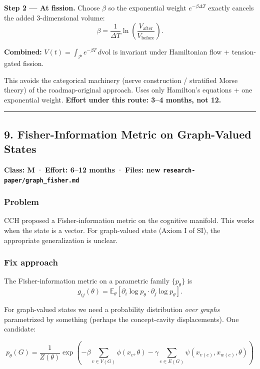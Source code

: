\documentclass[
  11pt,
  a4paper,
]{article}
\begin{document}
\textbf{Step 2 --- At fission.} Choose \(\beta\) so the exponential
weight \(e^{-\beta \Delta T}\) exactly cancels the added 3-dimensional
volume: \[
\beta = \frac{1}{\Delta T} \ln\!\left(\frac{V_\text{after}}{V_\text{before}}\right).
\]

\textbf{Combined:}
\(V(t) = \int_{\mathcal{P}} e^{-\beta T} \, d\text{vol}\) is invariant
under Hamiltonian flow + tension-gated fission.

This avoids the categorical machinery (nerve construction / stratified
Morse theory) of the roadmap-original approach. Uses only Hamilton's
equations + one exponential weight. \textbf{Effort under this route:
3--4 months, not 12.}

\begin{center}\rule{0.5\linewidth}{0.5pt}\end{center}

\subsection{9. Fisher-Information Metric on Graph-Valued
States}\label{fisher-information-metric-on-graph-valued-states}

\textbf{Class: M} · \textbf{Effort: 6--12 months} · \textbf{Files: new
\texttt{research-paper/graph\_fisher.md}}

\subsubsection{Problem}\label{problem-8}

CCH proposed a Fisher-information metric on the cognitive manifold. This
works when the state is a vector. For graph-valued state (Axiom I of
SI), the appropriate generalization is unclear.

\subsubsection{Fix approach}\label{fix-approach-1}

The Fisher-information metric on a parametric family \(\{p_\theta\}\) is
\[
g_{ij}(\theta) = \mathbb{E}_\theta\left[\partial_i \log p_\theta \cdot \partial_j \log p_\theta\right].
\]

For graph-valued states we need a probability distribution \emph{over
graphs} parametrized by something (perhaps the concept-cavity
displacements). One candidate:

\[
p_\theta(G) = \frac{1}{Z(\theta)} \exp\left(-\beta \sum_{v \in V(G)} \phi(x_v, \theta) - \gamma \sum_{e \in E(G)} \psi(x_{v(e)}, x_{w(e)}, \theta)\right)
\]
\end{document}

